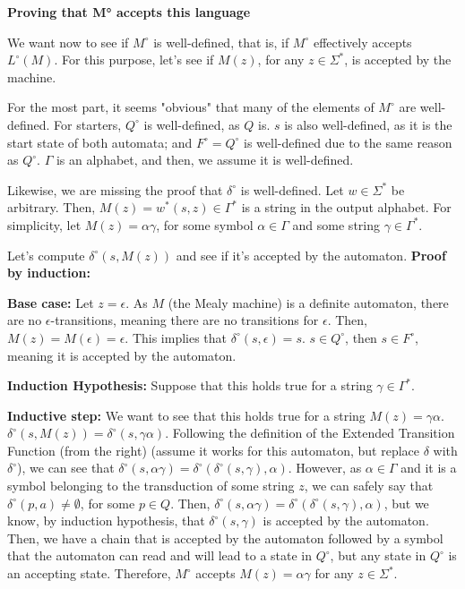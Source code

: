 \documentclass[12pt]{article}
\begin{document}
\textbf{Proving that M° accepts this language}

We want now to see if \(M^{\circ}\) is well-defined, that is, if \(M^{\circ}\) effectively accepts \(L^{\circ}(M)\). For this purpose, let's see if \(M(z)\), for any \(z \in \Sigma^*\), is accepted by the machine.

For the most part, it seems "obvious" that many of the elements of \(M^{\circ}\) are well-defined. For starters, \(Q^{\circ}\) is well-defined, as \(Q\) is. \(s\) is also well-defined, as it is the start state of both automata; and \(F^{\circ} = Q^{\circ}\) is well-defined due to the same reason as \(Q^{\circ}\). \(\Gamma\) is an alphabet, and then, we assume it is well-defined.

Likewise, we are missing the proof that \(\delta^{\circ}\) is well-defined. Let \(w \in \Sigma^*\) be arbitrary. Then, \(M(z) = w^*(s, z) \in \Gamma^*\) is a string in the output alphabet. For simplicity, let \(M(z) = \alpha\gamma\), for some symbol \(\alpha \in \Gamma\) and some string \(\gamma \in \Gamma^*\).

Let's compute \(\delta^{\circ}(s, M(z))\) and see if it's accepted by the automaton. 
\textbf{Proof by induction:}

\textbf{Base case:} Let \(z = \epsilon\). As \(M\) (the Mealy machine) is a definite automaton, there are no \(\epsilon\)-transitions, meaning there are no transitions for \(\epsilon\). Then, \(M(z) = M(\epsilon) = \epsilon\). This implies that \(\delta^{\circ}(s, \epsilon) = s\). \(s \in Q^{\circ}\), then \(s \in F^{\circ}\), meaning it is accepted by the automaton.

\textbf{Induction Hypothesis:} Suppose that this holds true for a string \(\gamma \in \Gamma^*\).

\textbf{Inductive step:} We want to see that this holds true for a string \(M(z) = \gamma\alpha\). \(\delta^{\circ}(s, M(z)) = \delta^{\circ}(s, \gamma\alpha)\). Following the definition of the Extended Transition Function (from the right) (assume it works for this automaton, but replace \(\delta\) with \(\delta^{\circ}\)), we can see that \(\delta^{\circ}(s, \alpha\gamma) = \delta^{\circ}(\delta^{\circ}(s, \gamma), \alpha)\). However, as \(\alpha \in \Gamma\) and it is a symbol belonging to the transduction of some string \(z\), we can safely say that \(\delta^{\circ}(p, a) \neq \emptyset\), for some \(p \in Q\). Then, \(\delta^{\circ}(s, \alpha\gamma) = \delta^{\circ}(\delta^{\circ}(s, \gamma), \alpha)\), but we know, by induction hypothesis, that \(\delta^{\circ}(s, \gamma)\) is accepted by the automaton. Then, we have a chain that is accepted by the automaton followed by a symbol that the automaton can read and will lead to a state in \(Q^{\circ}\), but any state in \(Q^{\circ}\) is an accepting state. Therefore, \(M^{\circ}\) accepts \(M(z) = \alpha\gamma\) for any \(z \in \Sigma^*\).
\end{document}
